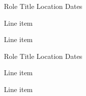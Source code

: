 

\begin{cventries}

  \cventry
    {Role} %
    {Title} %
    {Location} %
    {Dates} %
    {} %
    {
      \begin{cvitems} %
        \item {Line item}
        \item {Line item}
      \end{cvitems}
    }

  \cventry
    {Role} %
    {Title} %
    {Location} %
    {Dates} %
    {} %
    {
        \begin{cvitems} %
        \item {Line item}
        \item {Line item}
        \end{cvitems}
    }


\end{cventries}
